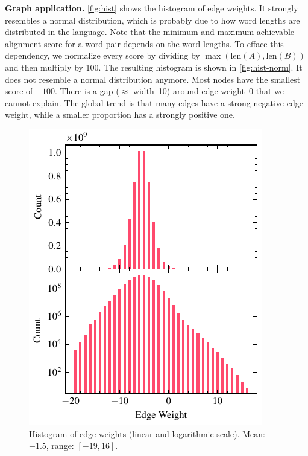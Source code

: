 \textbf{Graph application.} \autoref{fig:hist} shows the histogram of edge weights. It strongly resembles a normal distribution, which is probably due to how word lengths are distributed in the language. Note that the minimum and maximum achievable alignment score for a word pair depends on the word lengths. To efface this dependency, we normalize every score by dividing by $\max(\text{len}(A), \text{len}(B))$ and then multiply by 100. The resulting histogram is shown in \autoref{fig:hist-norm}. It does not resemble a normal distribution anymore. Most nodes have the smallest score of $-100$. There is a gap ($\approx$ width~10) around edge weight~0 that we cannot explain. The global trend is that many edges have a strong negative edge weight, while a smaller proportion has a strongly positive one.\label{paragraph:normalization}

\vspace{-1.1em}

\begin{figure}[H]
    \centering
    \includegraphics[width=0.9\linewidth]{assets/edge_weights.pdf}
    \caption{Histogram of edge weights (linear and logarithmic scale). Mean: $-1.5$, range: $[-19, 16]$.}
    \label{fig:hist}
\end{figure}

